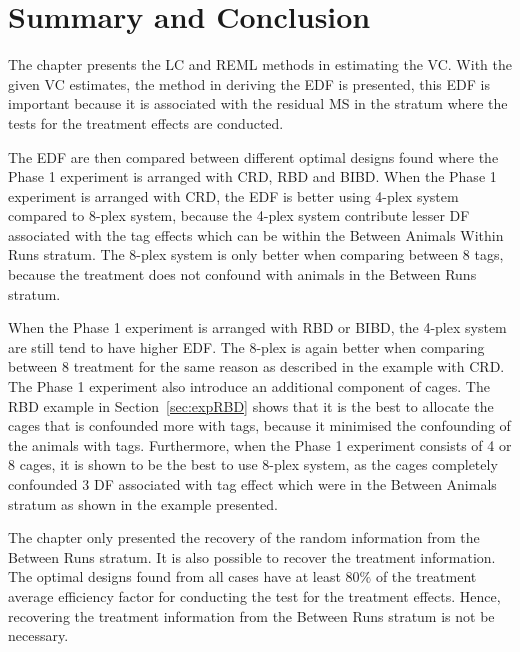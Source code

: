 \documentclass[12pt,a4paper]{article}
\begin{document}
\section{Summary and Conclusion}
\label{sec:conclusion}
The chapter presents the LC and REML methods in estimating the VC. With the given VC estimates, the method in deriving the EDF is presented, this EDF is important because it is associated with the residual MS in the stratum where the tests for the treatment effects are conducted. 

The EDF are then compared between different optimal designs found where the Phase 1 experiment is arranged with CRD, RBD and BIBD. When the Phase 1 experiment is arranged with CRD, the EDF is better using 4-plex system compared to 8-plex system, because the 4-plex system contribute lesser DF associated with the tag effects which can be within the Between Animals Within Runs stratum. The 8-plex system is only better when comparing between 8 tags, because the treatment does not confound with animals in the Between Runs stratum. 

When the Phase 1 experiment is arranged with RBD or BIBD, the 4-plex system are still tend to have higher EDF. The 8-plex is again better when comparing between 8 treatment for the same reason as described in the example with CRD. The Phase 1 experiment also introduce an additional component of cages. The RBD example in Section~\ref{sec:expRBD} shows that it is the best to allocate the cages that is confounded more with tags, because it minimised the confounding of the animals with tags. Furthermore, when the Phase 1 experiment consists of 4 or 8 cages, it is shown to be the best to use 8-plex system, as the cages completely confounded 3 DF associated with tag effect which were in the Between Animals stratum as shown in the example presented.   

The chapter only presented the recovery of the random information from the Between Runs stratum. It is also possible to recover the treatment information. The optimal designs found from all cases have at least $80\%$ of the treatment average efficiency factor for conducting the test for the treatment effects. Hence, recovering the treatment information from the Between Runs stratum is not be necessary. 




\end{document}
